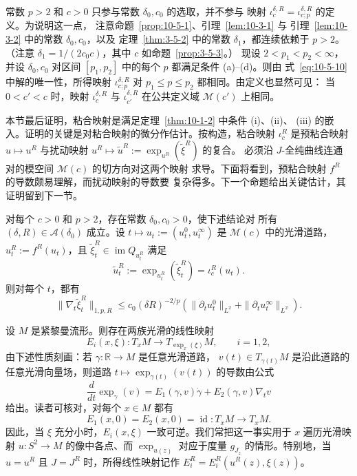 \begin{remark}\label{rem:10-5-3}
常数 $p>2$ 和 $c>0$ 只参与常数 $\delta_0,c_0$ 的选取，并不参与
映射 $\iota_c^{\delta,R}=\iota_{c;p}^{\delta,R}$ 的定义。为说明这一点，
注意命题~\ref{prop:10-5-1}、引理~\ref{lem:10-3-1} 与
引理~\ref{lem:10-3-2} 中的常数 $\delta_0,c_0$，以及
定理~\ref{thm:3-5-2} 中的常数 $\delta_1$，都连续依赖于 $p>2$。
（注意 $\delta_1=1/(2c_0c)$，其中 $c$ 如命题~\ref{prop:3-5-3}。）
现设 $2<p_1<p_2<\infty$，并设 $\delta_0,c_0$ 对区间
$[p_1,p_2]$ 中的每个 $p$ 都满足条件 (a)--(d)。则由
式~\eqref{eq:10-5-10} 中解的唯一性，所得映射
$\iota_{c;p}^{\delta,R}$ 对 $p_1\le p\le p_2$ 都相同。由定义也显然可见：
当 $0<c'<c$ 时，映射 $\iota_c^{\delta,R}$ 与
$\iota_{c'}^{\delta,R}$ 在公共定义域 $\mathcal M(c')$ 上相同。
\end{remark}

本节最后证明，粘合映射是满足定理~\ref{thm:10-1-2} 中条件 (i)、(ii)、
(iii) 的嵌入。证明的关键是对粘合映射的微分作估计。按构造，粘合映射
$\iota_c^R$ 是预粘合映射 $u\mapsto u^R$ 与扰动映射
$u^R\mapsto\widetilde u^R:=\exp_{u^R}(\widetilde\xi^R)$ 的复合。
必须沿 $J$-全纯曲线连通对的模空间 $\mathcal M(c)$ 的切方向对这两个映射
求导。下面将看到，预粘合映射 $f^R$ 的导数颇易理解，而扰动映射的导数要
复杂得多。下一个命题给出关键估计，其证明留到下一节。

\begin{proposition}\label{prop:10-5-4}
对每个 $c>0$ 和 $p>2$，存在常数 $\delta_0,c_0>0$，使下述结论对
所有 $(\delta,R)\in\mathcal A(\delta_0)$ 成立。设
$t\mapsto u_t:=(u_t^0,u_t^\infty)$ 是 $\mathcal M(c)$ 中的光滑道路，
$u_t^R:=f^R(u_t)$，且 $\widetilde\xi_t^R\in\operatorname{im}Q_{u_t^R}$
满足
\[
  \widetilde u_t^R:=\exp_{u_t^R}(\widetilde\xi_t^R)
  =\iota_c^R(u_t).
\]
则对每个 $t$，都有
\begin{equation}\label{eq:10-5-13}
  \|\nabla_t\widetilde\xi_t^R\|_{1,p,R}
  \le c_0(\delta R)^{-2/p}
  \left(
    \|\partial_tu_t^0\|_{L^2}
    +\|\partial_tu_t^\infty\|_{L^2}
  \right).
\end{equation}
\end{proposition}

\begin{remark}\label{rem:10-5-5}
设 $M$ 是紧黎曼流形。则存在两族光滑的线性映射
\[
  E_i(x,\xi):T_xM\longrightarrow T_{\exp_x(\xi)}M,
  \qquad i=1,2,
\]
由下述性质刻画：若 $\gamma:\mathbb R\to M$ 是任意光滑道路，
$v(t)\in T_{\gamma(t)}M$ 是沿此道路的任意光滑向量场，则道路
$t\mapsto\exp_{\gamma(t)}(v(t))$ 的导数由公式
\[
  \frac{d}{dt}\exp_\gamma(v)
  =E_1(\gamma,v)\dot\gamma+E_2(\gamma,v)\nabla_tv
\]
给出。读者可核对，对每个 $x\in M$ 都有
\[
  E_1(x,0)=E_2(x,0)=\operatorname{id}:T_xM\longrightarrow T_xM.
\]
因此，当 $\xi$ 充分小时，$E_i(x,\xi)$ 一致可逆。我们常把这一事实用于
$x$ 遍历光滑映射 $u:S^2\to M$ 的像中各点、而
$\exp_{u(z)}$ 对应于度量 $g_{J_z}$ 的情形。特别地，当 $u=u^R$ 且
$J=J^R$ 时，所得线性映射记作
$E_i^R=E_i^R(u^R(z),\xi(z))$。
\end{remark}

